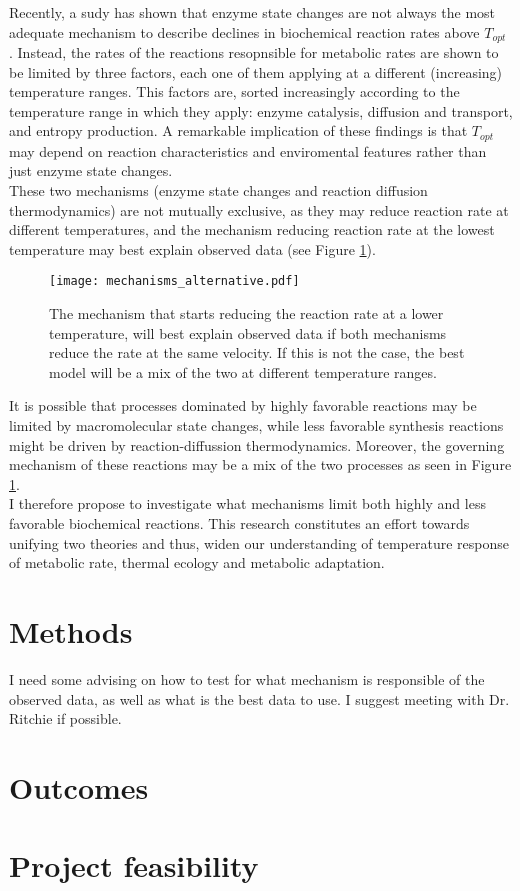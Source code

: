 \documentclass[titlepage,11pt]{article}
\begin{document}
\begin{linenumbers}
			Recently, a sudy has shown that enzyme state changes are not always the most adequate mechanism to describe declines in biochemical reaction rates above $ T_{opt} $  \cite{Ritchie2018}. Instead, the rates of the reactions resopnsible for metabolic rates are shown to be limited by three factors, each one of them applying at a different (increasing) temperature ranges. This factors are, sorted increasingly according to the temperature range in which they apply: enzyme catalysis, diffusion and transport, and entropy production. A remarkable implication of these findings is that $ T_{opt} $ may depend on reaction characteristics and enviromental features rather than just enzyme state changes.\\
			These two mechanisms (enzyme state changes and reaction diffusion thermodynamics) are not mutually exclusive, as they may reduce reaction rate at different temperatures, and the mechanism reducing reaction rate at the lowest temperature may best explain observed data (see Figure \ref{alternative_mechanisms}).\\
			\begin{figure}\label{alternative_mechanisms}
				\centering
				\texttt{[image: mechanisms\_alternative.pdf]}
				\caption{The mechanism that starts reducing the reaction rate at a lower temperature, will best explain observed data if both mechanisms reduce the rate at the same velocity. If this is not the case, the best model will be a mix of the two at different temperature ranges.}
			\end{figure}It is possible that processes dominated by highly favorable reactions may be limited by macromolecular state changes, while less favorable synthesis reactions might be driven by reaction-diffussion thermodynamics. Moreover, the governing mechanism of these reactions may be a mix of the two processes as seen in Figure \ref{alternative_mechanisms}.\\
			I therefore propose to investigate what mechanisms limit  both highly and less favorable biochemical reactions. This research constitutes an effort towards unifying two theories and thus, widen our understanding of temperature response of metabolic rate, thermal ecology and metabolic adaptation. 
			
		\section{Methods}
			I need some advising on how to test for what mechanism is responsible of the observed data, as well as what is the best data to use. I suggest meeting with Dr. Ritchie if possible.
		\section{Outcomes}
		\section{Project feasibility}
	\end{linenumbers}
	\newpage
	
	
	
\end{document}
